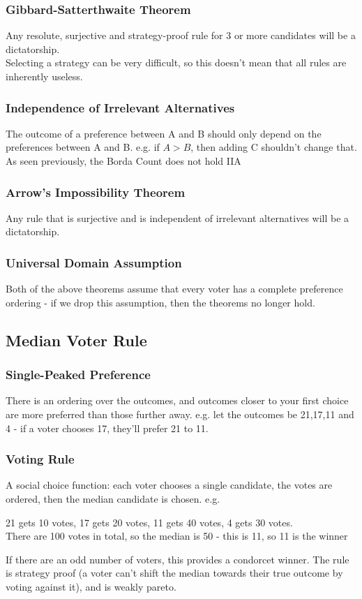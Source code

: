 \subsubsection{Gibbard-Satterthwaite Theorem}
Any resolute, surjective and strategy-proof rule for 3 or more candidates will be a dictatorship.\\
Selecting a strategy can be very difficult, so this doesn't mean that all rules are inherently useless.

\subsubsection{Independence of Irrelevant Alternatives}
The outcome of a preference between A and B should only depend on the preferences between A and B. e.g. if $A>B$, then adding C shouldn't change that. As seen previously, the Borda Count does not hold IIA

\subsubsection{Arrow's Impossibility Theorem}
Any rule that is surjective and is independent of irrelevant alternatives will be a dictatorship.

\subsubsection{Universal Domain Assumption}
Both of the above theorems assume that every voter has a complete preference ordering - if we drop this assumption, then the theorems no longer hold.

\subsection{Median Voter Rule}

\subsubsection{Single-Peaked Preference}
There is an ordering over the outcomes, and outcomes closer to your first choice are more preferred than those further away. e.g. let the outcomes be 21,17,11 and 4 - if a voter chooses 17, they'll prefer 21 to 11. 

\subsubsection{Voting Rule}
A social choice function: each voter chooses a single candidate, the votes are ordered, then the median candidate is chosen. e.g. 
\begin{center}
    21 gets 10 votes, 17 gets 20 votes, 11 gets 40 votes, 4 gets 30 votes. \\
    There are 100 votes in total, so the median is 50 - this is 11, so 11 is the winner
\end{center}
If there are an odd number of voters, this provides a condorcet winner. The rule is strategy proof (a voter can't shift the median towards their true outcome by voting against it), and is weakly pareto.